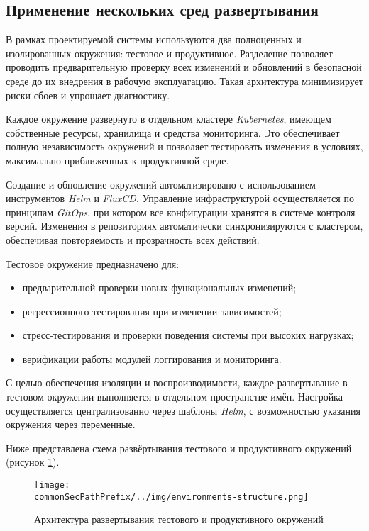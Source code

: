 \subsection{Применение нескольких сред развертывания}

В рамках проектируемой системы используются два полноценных и изолированных окружения: тестовое и продуктивное. Разделение позволяет проводить предварительную проверку всех изменений и обновлений в безопасной среде до их внедрения в рабочую эксплуатацию. Такая архитектура минимизирует риски сбоев и упрощает диагностику.

Каждое окружение развернуто в отдельном кластере \textit{Kubernetes}, имеющем собственные ресурсы, хранилища и средства мониторинга. Это обеспечивает полную независимость окружений и позволяет тестировать изменения в условиях, максимально приближенных к продуктивной среде.

Создание и обновление окружений автоматизировано с использованием инструментов \textit{Helm} и \textit{FluxCD}. Управление инфраструктурой осуществляется по принципам \textit{GitOps}, при котором все конфигурации хранятся в системе контроля версий. Изменения в репозиториях автоматически синхронизируются с кластером, обеспечивая повторяемость и прозрачность всех действий.

Тестовое окружение предназначено для:
\begin{itemize}
    \item предварительной проверки новых функциональных изменений;
    \item регрессионного тестирования при изменении зависимостей;
    \item стресс-тестирования и проверки поведения системы при высоких нагрузках;
    \item верификации работы модулей логгирования и мониторинга.
\end{itemize}

С целью обеспечения изоляции и воспроизводимости, каждое развертывание в тестовом окружении выполняется в отдельном пространстве имён. Настройка осуществляется централизованно через шаблоны \textit{Helm}, с возможностью указания окружения через переменные.

Ниже представлена схема развёртывания тестового и продуктивного окружений (рисунок \ref{fig:environments-structure.png}).

\begin{figure}[ht]
    \centering
    \texttt{[image: \\commonSecPathPrefix/../img/environments-structure.png]}
    \caption{Архитектура развертывания тестового и продуктивного окружений}
    \label{fig:environments-structure.png}
\end{figure}

